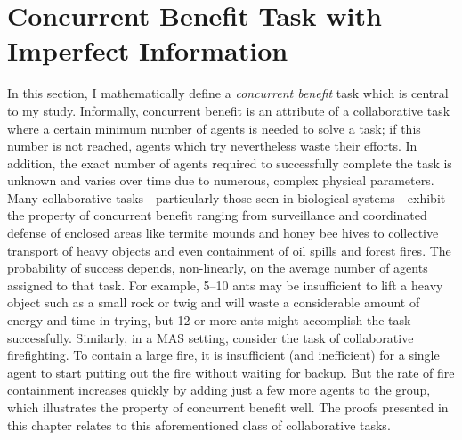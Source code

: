 \documentclass[defaultstyle,12pt]{thesis}
\begin{document}
\section{Concurrent Benefit Task with Imperfect Information}\label{sec:conbenefit}
In this section, I mathematically define a \emph{concurrent benefit} task which is central to my study. Informally, concurrent benefit is an attribute of a collaborative task where a certain minimum number of agents is needed to solve a task; if this number is not reached, agents which try nevertheless waste their efforts. In addition, the exact number of agents required to successfully complete the task is unknown and varies over time due to numerous, complex physical parameters. Many collaborative tasks---particularly those seen in biological systems---exhibit the property of concurrent benefit ranging from surveillance and coordinated defense of enclosed areas like termite mounds and honey bee hives \cite{Breed1990} to collective transport of heavy objects and even containment of oil spills and forest fires. The probability of success depends, non-linearly, on the average number of agents assigned to that task. For example, 5--10 ants may be insufficient to lift a heavy object such as a small rock or twig and will waste a considerable amount of energy and time in trying, but 12 or more ants might accomplish the task successfully. Similarly, in a MAS setting, consider the task of collaborative firefighting. To contain a large fire, it is insufficient (and inefficient) for a single agent to start putting out the fire without waiting for backup. But the rate of fire containment increases quickly by adding just a few more agents to the group, which illustrates the property of concurrent benefit well. The proofs presented in this chapter relates to this aforementioned class of collaborative tasks.
\end{document}
